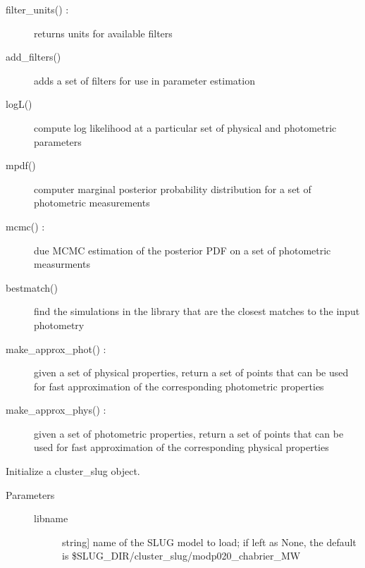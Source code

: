 \documentclass[letterpaper,10pt,english]{sphinxmanual}
\begin{document}
\begin{fulllineitems}
\begin{description}
\begin{description}
\item[{filter\_units() :}] \leavevmode
returns units for available filters

\item[{add\_filters()}] \leavevmode{[}{]}
adds a set of filters for use in parameter estimation

\item[{logL()}] \leavevmode{[}{]}
compute log likelihood at a particular set of physical and
photometric parameters

\item[{mpdf()}] \leavevmode{[}{]}
computer marginal posterior probability distribution for a
set of photometric measurements

\item[{mcmc() :}] \leavevmode
due MCMC estimation of the posterior PDF on a set of
photometric measurments

\item[{bestmatch()}] \leavevmode{[}{]}
find the simulations in the library that are the closest
matches to the input photometry

\item[{make\_approx\_phot() :}] \leavevmode
given a set of physical properties, return a set of points
that can be used for fast approximation of the corresponding
photometric properties

\item[{make\_approx\_phys() :}] \leavevmode
given a set of photometric properties, return a set of points
that can be used for fast approximation of the corresponding
physical properties

\end{description}

\end{description}

\begin{fulllineitems}
\label{cluster_slug:slugpy.cluster_slug.cluster_slug.__init__}
Initialize a cluster\_slug object.
\begin{description}
\item[{Parameters}] \leavevmode\begin{description}
\item[{libname}] \leavevmode{[}string{]}
name of the SLUG model to load; if left as None, the default
is \$SLUG\_DIR/cluster\_slug/modp020\_chabrier\_MW


\end{description}
\end{description}
\end{fulllineitems}
\end{fulllineitems}
\end{document}
